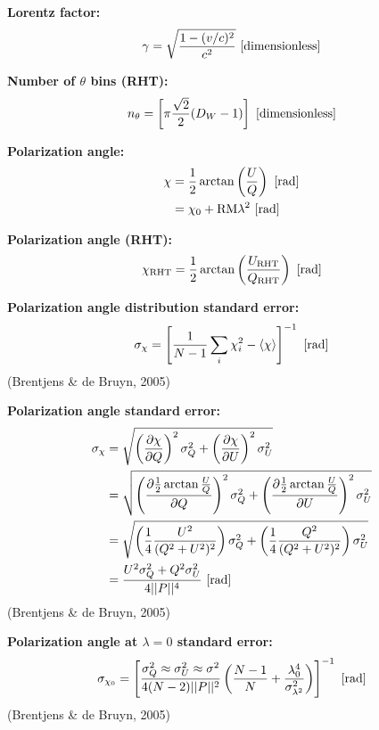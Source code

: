 \documentclass[a4paper,11pt]{article}
\begin{document}
{\noindent}\textbf{Lorentz factor:}
\begin{align*}
    \gamma = \sqrt{\frac{1 - (v/c)^2}{c^2}} ~ [{\rm dimensionless}]
\end{align*}

{\noindent}\textbf{Number of $\theta$ bins (RHT):}
\begin{align*}
    n_\theta = \left[\pi\frac{\sqrt{2}}{2}(D_W-1)\right] ~ [{\rm dimensionless}]
\end{align*}

{\noindent}\textbf{Polarization angle:}
\begin{align*}
\chi &= \dfrac{1}{2}\arctan\left(\dfrac{U}{Q}\right) ~ [{\rm rad}] \\
&= \chi_0 + \mathrm{RM}\lambda^2 ~ [{\rm rad}]
\end{align*}

{\noindent}\textbf{Polarization angle (RHT):}
\begin{align*}
\chi_\mathrm{RHT} = \dfrac{1}{2}\arctan\left(\dfrac{U_\mathrm{RHT}}{Q_\mathrm{RHT}}\right) ~ [{\rm rad}]
\end{align*}

{\noindent}\textbf{Polarization angle distribution standard error:} 
\begin{align*}
\sigma_\chi = \left[ \dfrac{1}{N-1} \sum_i\chi_i^2 - \langle\chi\rangle \right]^{-1} ~ [{\rm rad}]
\end{align*}
(Brentjens \& de Bruyn, 2005)

{\noindent}\textbf{Polarization angle standard error:}
\begin{align*}
\sigma_\chi &= \sqrt{ \left(\dfrac{\partial\chi}{\partial Q}\right)^2\sigma_Q^2 + \left(\dfrac{\partial\chi}{\partial U}\right)^2\sigma_U^2 }\\
&= \sqrt{ \left(\dfrac{\partial\frac{1}{2}\arctan\frac{U}{Q}}{\partial Q}\right)^2\sigma_Q^2 + \left(\dfrac{\partial\frac{1}{2}\arctan\frac{U}{Q}}{\partial U}\right)^2\sigma_U^2 } \\
&= \sqrt{ \left(\dfrac{1}{4}\dfrac{U^2}{(Q^2+U^2)^2}\right)\sigma_Q^2 + \left(\dfrac{1}{4}\dfrac{Q^2}{(Q^2+U^2)^2}\right)\sigma_U^2 } \\
&= \dfrac{U^2\sigma_Q^2 + Q^2\sigma_U^2}{4\lvert\lvert P \rvert\rvert^4} ~ [{\rm rad}]
\end{align*}
(Brentjens \& de Bruyn, 2005)

{\noindent}\textbf{Polarization angle at $\lambda=0$ standard error:} 
\begin{align*}
\sigma_{\chi_0} = \left[ \dfrac{\sigma_Q^2\approx\sigma_U^2\approx\sigma^2}{4(N-2)\lvert\lvert P \rvert\rvert^2} \left( \dfrac{N-1}{N} + \dfrac{\lambda_0^4}{\sigma_{\lambda^2}^2} \right) \right]^{-1} ~ [{\rm rad}]
\end{align*}
(Brentjens \& de Bruyn, 2005)
\end{document}
